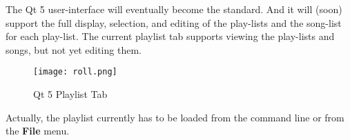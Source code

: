    The Qt 5 user-interface will eventually become the standard.
   And it will (soon) support the full display, selection, and editing of the
   play-lists and the song-list for each play-list.
   The current playlist tab supports viewing the play-lists and songs, but not
   yet editing them.

\begin{figure}[H]
   \centering 
   \texttt{[image: roll.png]}
   \caption*{Qt 5 Playlist Tab}
\end{figure}

   Actually, the playlist currently has to be loaded from the command line or
   from the \textbf{File} menu.

